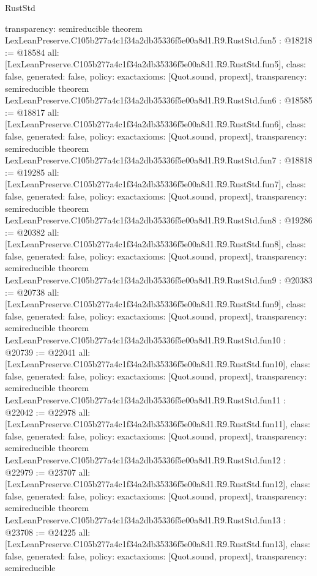 \begin{lexlean}{RustStd}
\begin{coremodule}
{  transparency: semireducible
}
theorem LexLeanPreserve.C105b277a4c1f34a2db35336f5e00a8d1.R9.RustStd.fun5 : @18218 := @18584 {
  all: [LexLeanPreserve.C105b277a4c1f34a2db35336f5e00a8d1.R9.RustStd.fun5],
  class: false,
  generated: false,
  policy: exact{axioms: [Quot.sound, propext]},
  transparency: semireducible
}
theorem LexLeanPreserve.C105b277a4c1f34a2db35336f5e00a8d1.R9.RustStd.fun6 : @18585 := @18817 {
  all: [LexLeanPreserve.C105b277a4c1f34a2db35336f5e00a8d1.R9.RustStd.fun6],
  class: false,
  generated: false,
  policy: exact{axioms: [Quot.sound, propext]},
  transparency: semireducible
}
theorem LexLeanPreserve.C105b277a4c1f34a2db35336f5e00a8d1.R9.RustStd.fun7 : @18818 := @19285 {
  all: [LexLeanPreserve.C105b277a4c1f34a2db35336f5e00a8d1.R9.RustStd.fun7],
  class: false,
  generated: false,
  policy: exact{axioms: [Quot.sound, propext]},
  transparency: semireducible
}
theorem LexLeanPreserve.C105b277a4c1f34a2db35336f5e00a8d1.R9.RustStd.fun8 : @19286 := @20382 {
  all: [LexLeanPreserve.C105b277a4c1f34a2db35336f5e00a8d1.R9.RustStd.fun8],
  class: false,
  generated: false,
  policy: exact{axioms: [Quot.sound, propext]},
  transparency: semireducible
}
theorem LexLeanPreserve.C105b277a4c1f34a2db35336f5e00a8d1.R9.RustStd.fun9 : @20383 := @20738 {
  all: [LexLeanPreserve.C105b277a4c1f34a2db35336f5e00a8d1.R9.RustStd.fun9],
  class: false,
  generated: false,
  policy: exact{axioms: [Quot.sound, propext]},
  transparency: semireducible
}
theorem LexLeanPreserve.C105b277a4c1f34a2db35336f5e00a8d1.R9.RustStd.fun10 : @20739 := @22041 {
  all: [LexLeanPreserve.C105b277a4c1f34a2db35336f5e00a8d1.R9.RustStd.fun10],
  class: false,
  generated: false,
  policy: exact{axioms: [Quot.sound, propext]},
  transparency: semireducible
}
theorem LexLeanPreserve.C105b277a4c1f34a2db35336f5e00a8d1.R9.RustStd.fun11 : @22042 := @22978 {
  all: [LexLeanPreserve.C105b277a4c1f34a2db35336f5e00a8d1.R9.RustStd.fun11],
  class: false,
  generated: false,
  policy: exact{axioms: [Quot.sound, propext]},
  transparency: semireducible
}
theorem LexLeanPreserve.C105b277a4c1f34a2db35336f5e00a8d1.R9.RustStd.fun12 : @22979 := @23707 {
  all: [LexLeanPreserve.C105b277a4c1f34a2db35336f5e00a8d1.R9.RustStd.fun12],
  class: false,
  generated: false,
  policy: exact{axioms: [Quot.sound, propext]},
  transparency: semireducible
}
theorem LexLeanPreserve.C105b277a4c1f34a2db35336f5e00a8d1.R9.RustStd.fun13 : @23708 := @24225 {
  all: [LexLeanPreserve.C105b277a4c1f34a2db35336f5e00a8d1.R9.RustStd.fun13],
  class: false,
  generated: false,
  policy: exact{axioms: [Quot.sound, propext]},
  transparency: semireducible
}
\end{coremodule}
\end{lexlean}
